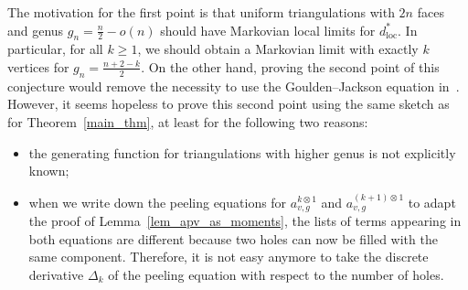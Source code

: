 \documentclass[10pt]{amsart}
\theoremstyle{definition}\newtheorem{defi}[theo]{Definition}\newtheorem{rema}[theo]{Remark}\newtheorem{exam}[theo]{Example}\newtheorem{exem}[theo]{Example}\newtheorem{nota}[theo]{Notation}
\newcommand{\loc}{\mathrm{loc}}
\begin{document}
The motivation for the first point is that uniform triangulations with $2n$ faces and genus $g_n=\frac{n}{2}-o(n)$ should have Markovian local limits for $d_{\loc}^*$. In particular, for all $k \geq 1$, we should obtain a Markovian limit with exactly $k$ vertices for $g_n=\frac{n+2-k}{2}$. On the other hand, proving the second point of this conjecture would remove the necessity to use the Goulden--Jackson equation in~\cite{BL19}. However, it seems hopeless to prove this second point using the same sketch as for Theorem~\ref{main_thm}, at least for the following two reasons:
\begin{itemize}
\item the generating function for triangulations with higher genus is not explicitly known;
\item when we write down the peeling equations for $a_{v,g}^{k \otimes 1}$ and $a_{v,g}^{(k+1) \otimes 1}$ to adapt the proof of Lemma~\ref{lem_apv_as_moments}, the lists of terms appearing in both equations are different because two holes can now be filled with the same component. Therefore, it is not easy anymore to take the discrete derivative $\Delta_k$ of the peeling equation with respect to the number of holes.
\end{itemize}
\end{document}
